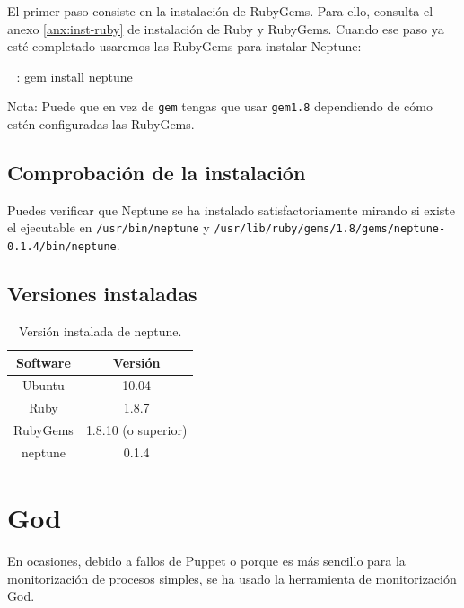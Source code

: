 El primer paso consiste en la instalación de RubyGems. Para ello, consulta el anexo \ref{anx:inst-ruby} de instalación de Ruby y RubyGems. Cuando ese paso ya esté completado usaremos las RubyGems para instalar Neptune:

\begin{bashcode}
_: gem install neptune
\end{bashcode}

Nota: Puede que en vez de \texttt{gem} tengas que usar \texttt{gem1.8} dependiendo de cómo estén configuradas las RubyGems.


\subsection{Comprobación de la instalación}

Puedes verificar que Neptune se ha instalado satisfactoriamente mirando si existe el ejecutable en \texttt{/usr/bin/neptune} y \texttt{/usr/lib/ruby/gems/1.8/gems/neptune-0.1.4/bin/neptune}.


\subsection{Versiones instaladas}

\begin{table}[!htbp]
\centering
   \begin{tabular}{|c|c|}
      \hline
      \textbf{Software} & \textbf{Versión} \\ \hline
      Ubuntu & 10.04 \\ \hline
      Ruby & 1.8.7 \\ \hline
      RubyGems & 1.8.10 (o superior) \\ \hline
      neptune & 0.1.4 \\ \hline
   \end{tabular}
\caption{Versión instalada de neptune.}
\label{table:neptune-versions}
\end{table}


\section{God}
\label{anx:inst-god}


En ocasiones, debido a fallos de Puppet o porque es más sencillo para la monitorización de procesos simples, se ha usado la herramienta de monitorización God.


